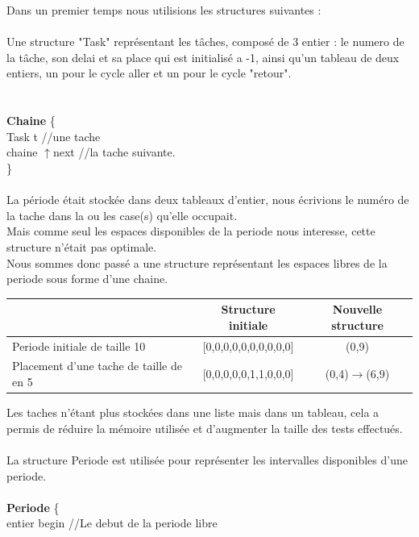 \documentclass[11pt]{article}
\begin{document}
Dans un premier temps nous utilisions les structures suivantes :\\\\
Une structure "Task" représentant les tâches, composé de 3 entier : le numero de la tâche, son delai et sa place qui est initialisé a -1, ainsi qu'un tableau de deux entiers, un pour le cycle aller et un pour le cycle "retour".\\ 
\\\\
\indent \textbf{Chaine} \{ \\
    \indent \indent Task t   \indent \indent \indent //une tache\\
    \indent \indent chaine $\uparrow$next \indent //la tache suivante.\\
\indent\}
\\\\
\indent La période était stockée dans deux tableaux d'entier, nous écrivions le numéro de la tache dans la ou les case(s) qu'elle occupait.\\
Mais comme seul les espaces disponibles de la periode nous interesse, cette structure n'était pas optimale.\\
Nous sommes donc passé a une structure représentant les espaces libres de la periode sous forme d'une chaine.
\begin{center}
    \begin{tabular}{|l|c|c|}			
    \hline                                              & \textbf{Structure initiale}   & \textbf{Nouvelle structure} \\
    \hline 	Periode initiale de taille 10               & [0,0,0,0,0,0,0,0,0,0]         &(0,9)		     \\
    \hline 	Placement d'une tache de taille de en 5 	& [0,0,0,0,0,1,1,0,0,0] 		& (0,4)$\rightarrow$(6,9)   \\
    \hline
    \end{tabular}\vspace{1em}
\end{center}
\noindent Les taches n'étant plus stockées dans une liste mais dans un tableau, cela a permis de réduire la mémoire utilisée et d'augmenter la taille des tests effectués.\\\\
La structure Periode est utilisée pour représenter les intervalles disponibles d'une periode.\\\\
\indent \textbf{Periode} \{ \\
    \indent \indent entier begin    \indent \indent//Le debut de la periode libre\\
\end{document}
